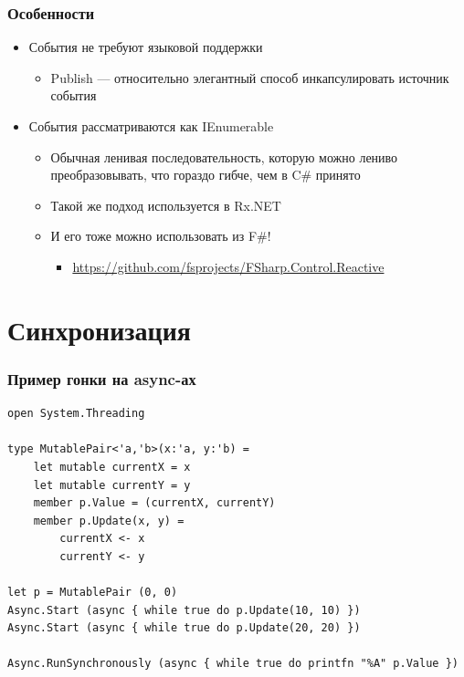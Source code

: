 \documentclass{../../slides-style}
\begin{document}
    \begin{frame}
        \frametitle{Особенности}
        \begin{itemize}
            \item События не требуют языковой поддержки
            \begin{itemize}
                \item Publish --- относительно элегантный способ инкапсулировать источник события
            \end{itemize}
            \item События рассматриваются как IEnumerable
            \begin{itemize}
                \item Обычная ленивая последовательность, которую можно лениво преобразовывать, что гораздо гибче, чем в C\# принято
                \item Такой же подход используется в Rx.NET
                \item И его тоже можно использовать из F\#!
                \begin{itemize}
                    \item \url{https://github.com/fsprojects/FSharp.Control.Reactive}
                \end{itemize}
            \end{itemize}
        \end{itemize}
    \end{frame}

    \section{Синхронизация}

    \begin{frame}[fragile]
        \frametitle{Пример гонки на async-ах}
        \begin{verbatim}
open System.Threading

type MutablePair<'a,'b>(x:'a, y:'b) =
    let mutable currentX = x
    let mutable currentY = y
    member p.Value = (currentX, currentY)
    member p.Update(x, y) =
        currentX <- x
        currentY <- y

let p = MutablePair (0, 0)
Async.Start (async { while true do p.Update(10, 10) })
Async.Start (async { while true do p.Update(20, 20) })

Async.RunSynchronously (async { while true do printfn "%A" p.Value })
        \end{verbatim}
    \end{frame}
\end{document}
